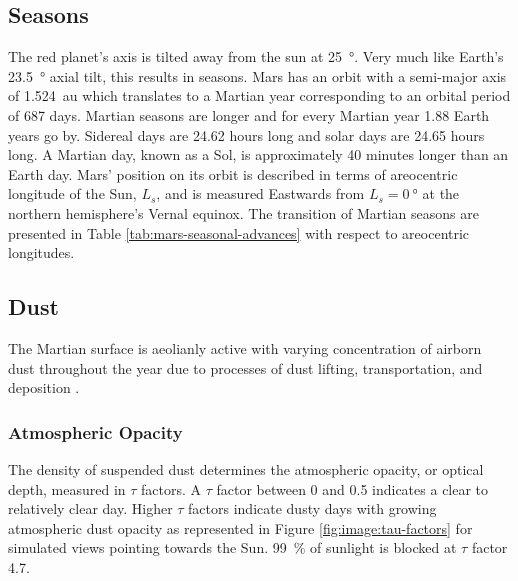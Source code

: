 %

\subsection{Seasons}
\label{sec:MartianEnvironment:Seasons}
The red planet's axis is tilted away from the sun at \SI{25}{\degree}. Very much like Earth's \SI{23.5}{\degree} axial tilt, this results in seasons. Mars has an orbit with a semi-major axis of \SI{1.524}{\astronomicalunit} which translates to a Martian year corresponding to an orbital period of 687 days. Martian seasons are longer and for every Martian year 1.88 Earth years go by. Sidereal days are 24.62 hours long and solar days are 24.65 hours long. A Martian day, known as a Sol, is approximately 40 minutes longer than an Earth day. Mars' position on its orbit is described in terms of areocentric longitude of the Sun, $L_{s}$, and is measured Eastwards from $L_{s} = \SI{0}{\degree}$ at the northern hemisphere's Vernal equinox. The transition of Martian seasons are presented in Table \ref{tab:mars-seasonal-advances} with respect to areocentric longitudes.



\clearpage
\subsection{Dust}
\label{sec:MartianEnvironment:Dust}
The Martian surface is aeolianly active with varying concentration of airborn dust throughout the year due to processes of dust lifting, transportation, and deposition .


\subsubsection{Atmospheric Opacity}
\label{sec:MartianEnvironment:Dust:AtmosphericOpacity}
The density of suspended dust determines the atmospheric opacity, or optical depth, measured in $\tau$ factors. A $\tau$ factor between 0 and 0.5 indicates a clear to relatively clear day. Higher $\tau$ factors indicate dusty days with growing atmospheric dust opacity as represented in Figure \ref{fig:image:tau-factors} for simulated views pointing towards the Sun. \SI{99}{\percent} of sunlight is blocked at $\tau$ factor 4.7.

